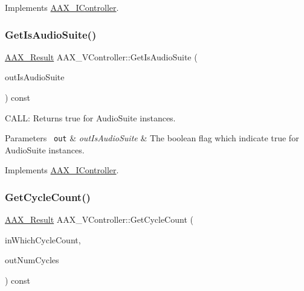 Implements \mbox{\hyperlink{a01789_a8326b2acec2d9c9039853adafd9b2bef}{A\+A\+X\+\_\+\+I\+Controller}}.

\mbox{\label{a01905_a3d3bd957f2b2f863333deadf5b8e6c6c}} 
\subsubsection{\texorpdfstring{GetIsAudioSuite()}{GetIsAudioSuite()}}
{\footnotesize\ttfamily \mbox{\hyperlink{a00392_a4d8f69a697df7f70c3a8e9b8ee130d2f}{A\+A\+X\+\_\+\+Result}} A\+A\+X\+\_\+\+V\+Controller\+::\+Get\+Is\+Audio\+Suite (\begin{DoxyParamCaption}\item[{\mbox{\hyperlink{a00392_aa216506530f1d19a2965931ced2b274b}{A\+A\+X\+\_\+\+C\+Boolean}} $\ast$}]{out\+Is\+Audio\+Suite }\end{DoxyParamCaption}) const\hspace{0.3cm}{\ttfamily [virtual]}}



C\+A\+LL\+: Returns true for Audio\+Suite instances. 


\begin{DoxyParams}[1]{Parameters}
\mbox{\texttt{ out}}  & {\em out\+Is\+Audio\+Suite} & The boolean flag which indicate true for Audio\+Suite instances. \\
\hline
\end{DoxyParams}


Implements \mbox{\hyperlink{a01789_af6d44bc336c3c2e4cca1a1684b556db3}{A\+A\+X\+\_\+\+I\+Controller}}.

\mbox{\label{a01905_aa3a0f0060f70e8167634daf6beadeae5}} 
\subsubsection{\texorpdfstring{GetCycleCount()}{GetCycleCount()}}
{\footnotesize\ttfamily \mbox{\hyperlink{a00392_a4d8f69a697df7f70c3a8e9b8ee130d2f}{A\+A\+X\+\_\+\+Result}} A\+A\+X\+\_\+\+V\+Controller\+::\+Get\+Cycle\+Count (\begin{DoxyParamCaption}\item[{\mbox{\hyperlink{a00662_a13e384f22825afd3db6d68395b79ce0d}{A\+A\+X\+\_\+\+E\+Property}}}]{in\+Which\+Cycle\+Count,  }\item[{\mbox{\hyperlink{a00392_ab247c0d8686c14e05cbb567ef276f249}{A\+A\+X\+\_\+\+C\+Property\+Value}} $\ast$}]{out\+Num\+Cycles }\end{DoxyParamCaption}) const\hspace{0.3cm}{\ttfamily [virtual]}}



